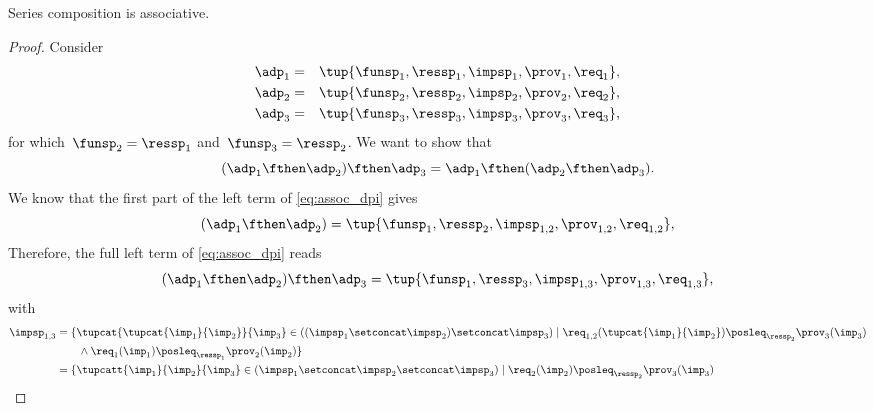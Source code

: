 \begin{lemma}
    Series composition is associative.
\end{lemma}
\begin{proof}
    Consider
    \begin{equation}
        \begin{aligned}
            \adp_{1} & = & \tup{\funsp_{1},\ressp_{1},\impsp_{1},\prov_{1},\req_{1}}, \\
            \adp_{2} & = & \tup{\funsp_{2},\ressp_{2},\impsp_{2},\prov_{2},\req_{2}}, \\
            \adp_{3} & = & \tup{\funsp_{3},\ressp_{3},\impsp_{3},\prov_{3},\req_{3}}, 
        \end{aligned}
    \end{equation}
    for which~$\funsp_{2}=\ressp_{1}$ and~$\funsp_{3}=\ressp_{2}$.
    We want to show that
    \begin{equation}
        \label{eq:assoc_dpi}
        (\adp_1\fthen \adp_2)\fthen \adp_3=\adp_1\fthen (\adp_2\fthen \adp_3).
    \end{equation}
    We know that the first part of the left term of \cref{eq:assoc_dpi} gives
    \begin{equation}
        (\adp_{1} \fthen \adp_{2})
        =
        \tup{ \funsp_{1},\ressp_{2},\impsp_{1,2},\prov_{1,2},\req_{1,2}},
    \end{equation}
    Therefore, the full left term of \cref{eq:assoc_dpi} reads
    \begin{equation}
        \label{eq:dpi_ass_1}
        (\adp_{1} \fthen \adp_{2})\fthen \adp_{3}=\tup{ \funsp_{1},\ressp_{3},\impsp_{1,3},\prov_{1,3},\req_{1,3}},
    \end{equation}
    with
    \begin{equation}
        \begin{aligned}
            \impsp_{1,3} & =  \{  \tupcat {\tupcat {\imp_{1}} {\imp_{2}}} {\imp_{3}} \in ((\impsp_{1} \setconcat \impsp_{2})\setconcat \impsp_{3})\mid\req_{1,2}(\tupcat {\imp_{1}} {\imp_{2}})\posleq_{\ressp_{2}}\prov_{3}(\imp_{3}) 
            \\
                         & \qquad \wedge \req_{1}(\imp_{1})\posleq_{\ressp_1}\prov_2(\imp_2)\}                                                                                                                                         \\
                         & =\{  \tupcatt{\imp_{1}}{\imp_{2}}{\imp_{3}} \in (\impsp_{1} \setconcat \impsp_{2}\setconcat \impsp_{3})\mid\req_{2}(\imp_2)\posleq_{\ressp_{2}}\prov_{3}(\imp_{3})                                          \\

\end{aligned}
\end{equation}
\end{proof}
